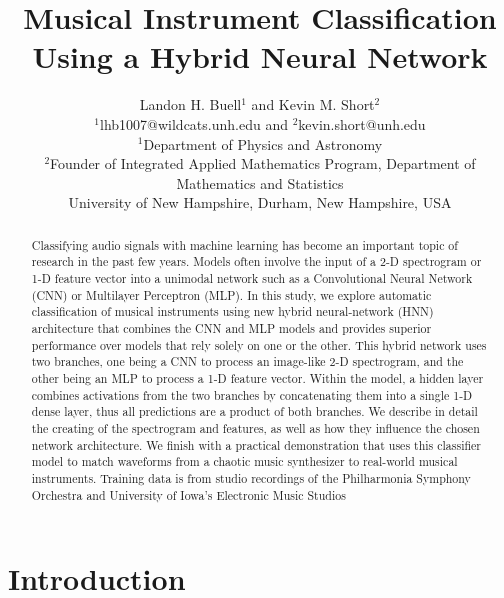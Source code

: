 \documentclass[conference,onecolumn,letterpaper]{IEEEtran}
\title{Musical Instrument Classification Using a Hybrid Neural Network}
\author{Landon H. Buell$^1$ and Kevin M. Short$^2$\\
        $^1$lhb1007@wildcats.unh.edu and 				$^2$kevin.short@unh.edu\\
        $^1$Department of Physics and Astronomy\\
        $^2$Founder of Integrated Applied Mathematics Program, Department of Mathematics and Statistics\\
        University of New Hampshire, Durham, New Hampshire, USA\\
       }
\begin{document}
\maketitle


\begin{abstract}
    Classifying audio signals with machine learning has become an important topic of research in the past few years. Models often involve the input of a 2-D spectrogram or 1-D feature vector into a unimodal network such as a Convolutional Neural Network (CNN) or Multilayer Perceptron (MLP). In this study, we explore automatic classification of musical instruments using new hybrid neural-network (HNN)  architecture that combines the CNN and MLP models and provides superior performance over models that rely solely on one or the other. This hybrid network uses two branches, one being a CNN to process an image-like 2-D spectrogram, and the other being an MLP to process a 1-D feature vector. Within the model, a hidden layer combines activations from the two branches by concatenating them into a single 1-D dense layer, thus all predictions are a product of both branches. We describe in detail the creating of the spectrogram and features, as well as how they influence the chosen network architecture. We finish with a practical demonstration that uses this classifier model to match waveforms from a chaotic music synthesizer to real-world musical instruments. Training data is from studio recordings of the Philharmonia Symphony Orchestra and University of Iowa's Electronic Music Studios
\end{abstract}


\section{Introduction}
\label{sec:Intro}

\end{document}
